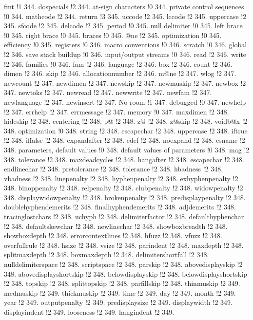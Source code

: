 fmt !1 344.
dospecials !2 344.
at-sign characters !0 344.
private control sequences !0 344.
mathcode !2 344.
return !3 345.
uccode !2 345.
lccode !2 345.
uppercase !2 345.
sfcode !2 345.
delcode !2 345.
period !0 345.
null delimiter !0 345.
left brace !0 345.
right brace !0 345.
braces !0 345.
@ne !2 345.
optimization !0 345.
efficiency !0 345.
registers !0 346.
macro conventions !0 346.
scratch !0 346.
global !2 346.
save stack buildup !0 346.
input/output streams !0 346.
read !2 346.
write !2 346.
families !0 346.
fam !2 346.
language !2 346.
box !2 346.
count !2 346.
dimen !2 346.
skip !2 346.
allocationnumber !2 346.
m@ne !2 347.
wlog !2 347.
newcount !2 347.
newdimen !2 347.
newskip !2 347.
newmuskip !2 347.
newbox !2 347.
newtoks !2 347.
newread !2 347.
newwrite !2 347.
newfam !2 347.
newlanguage !2 347.
newinsert !2 347.
No room !1 347.
debugged !0 347.
newhelp !2 347.
errhelp !2 347.
errmessage !2 347.
memory !0 347.
maxdimen !2 348.
hideskip !2 348.
centering !2 348.
p@ !2 348.
z@ !2 348.
z@skip !2 348.
voidb@x !2 348.
optimization !0 348.
string !2 348.
escapechar !2 348.
uppercase !2 348.
iftrue !2 348.
iffalse !2 348.
expandafter !2 348.
edef !2 348.
noexpand !2 348.
csname !2 348.
parameters, default values !0 348.
default values of parameters !0 348.
mag !2 348.
tolerance !2 348.
maxdeadcycles !2 348.
hangafter !2 348.
escapechar !2 348.
endlinechar !2 348.
pretolerance !2 348.
tolerance !2 348.
hbadness !2 348.
vbadness !2 348.
linepenalty !2 348.
hyphenpenalty !2 348.
exhyphenpenalty !2 348.
binoppenalty !2 348.
relpenalty !2 348.
clubpenalty !2 348.
widowpenalty !2 348.
displaywidowpenalty !2 348.
brokenpenalty !2 348.
predisplaypenalty !2 348.
doublehyphendemerits !2 348.
finalhyphendemerits !2 348.
adjdemerits !2 348.
tracinglostchars !2 348.
uchyph !2 348.
delimiterfactor !2 348.
defaulthyphenchar !2 348.
defaultskewchar !2 348.
newlinechar !2 348.
showboxbreadth !2 348.
showboxdepth !2 348.
errorcontextlines !2 348.
hfuzz !2 348.
vfuzz !2 348.
overfullrule !2 348.
hsize !2 348.
vsize !2 348.
parindent !2 348.
maxdepth !2 348.
splitmaxdepth !2 348.
boxmaxdepth !2 348.
delimitershortfall !2 348.
nulldelimiterspace !2 348.
scriptspace !2 348.
parskip !2 348.
abovedisplayskip !2 348.
abovedisplayshortskip !2 348.
belowdisplayskip !2 348.
belowdisplayshortskip !2 348.
topskip !2 348.
splittopskip !2 348.
parfillskip !2 348.
thinmuskip !2 349.
medmuskip !2 349.
thickmuskip !2 349.
time !2 349.
day !2 349.
month !2 349.
year !2 349.
outputpenalty !2 349.
predisplaysize !2 349.
displaywidth !2 349.
displayindent !2 349.
looseness !2 349.
hangindent !2 349.
